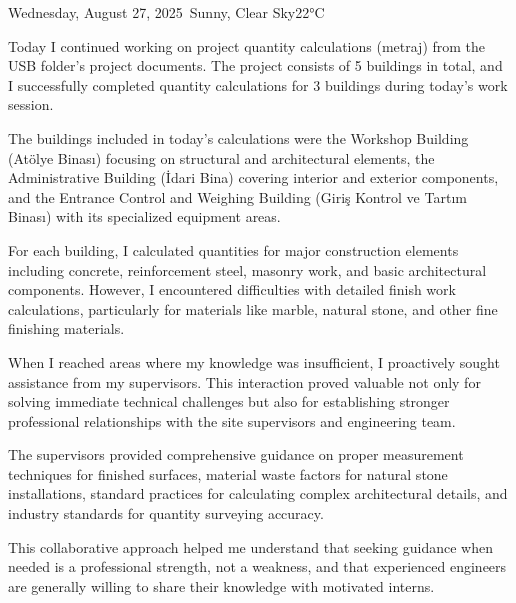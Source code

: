 \begin{dailyentry}{Wednesday, August 27, 2025}{\weathersunny\ Sunny, Clear Sky}{22°C}

\begin{workcontent}
Today I continued working on project quantity calculations (metraj) from the USB folder's project documents. The project consists of 5 buildings in total, and I successfully completed quantity calculations for 3 buildings during today's work session.

The buildings included in today's calculations were the Workshop Building (Atölye Binası) focusing on structural and architectural elements, the Administrative Building (İdari Bina) covering interior and exterior components, and the Entrance Control and Weighing Building (Giriş Kontrol ve Tartım Binası) with its specialized equipment areas.

For each building, I calculated quantities for major construction elements including concrete, reinforcement steel, masonry work, and basic architectural components. However, I encountered difficulties with detailed finish work calculations, particularly for materials like marble, natural stone, and other fine finishing materials.

When I reached areas where my knowledge was insufficient, I proactively sought assistance from my supervisors. This interaction proved valuable not only for solving immediate technical challenges but also for establishing stronger professional relationships with the site supervisors and engineering team.

The supervisors provided comprehensive guidance on proper measurement techniques for finished surfaces, material waste factors for natural stone installations, standard practices for calculating complex architectural details, and industry standards for quantity surveying accuracy.

This collaborative approach helped me understand that seeking guidance when needed is a professional strength, not a weakness, and that experienced engineers are generally willing to share their knowledge with motivated interns.
\begin{center}
\end{center}
\end{workcontent}


\end{dailyentry}
